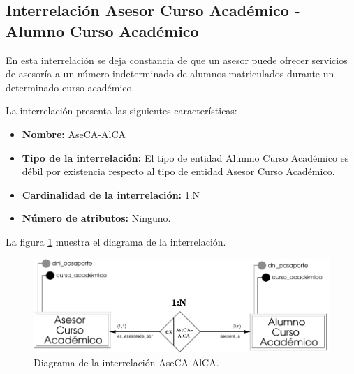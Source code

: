 \subsection{Interrelación Asesor Curso Académico - Alumno Curso Académico}

   \begin{description}
      \item[Definición] En esta interrelación se deja constancia de que un
      asesor puede ofrecer servicios de asesoría a un número indeterminado de
      alumnos matriculados durante un determinado curso académico.

      \item[Características] La interrelación presenta las siguientes
                             características:

         \begin{itemize}
            \item \textbf{Nombre:} AseCA-AlCA
            \item \textbf{Tipo de la interrelación:} El tipo de entidad
                  Alumno Curso Académico es débil por existencia respecto al
                  tipo de entidad Asesor Curso Académico.
            \item \textbf{Cardinalidad de la interrelación:} 1:N
            \item \textbf{Número de atributos:} Ninguno.
         \end{itemize}

      \item[Diagrama] La figura \ref{diagramaAseCA-AlCA} muestra el diagrama de
                      la interrelación.

       \item \begin{figure}[!ht]
            \begin{center}
            \includegraphics[]{07.Modelo_Entidad-Interrelacion/7.3.Analisis_Interrelaciones/diagramas/AseCA-AlCA.pdf}
            \caption{Diagrama de la interrelación AseCA-AlCA.}
            \label{diagramaAseCA-AlCA}
            \end{center}
         \end{figure}


\end{description}
